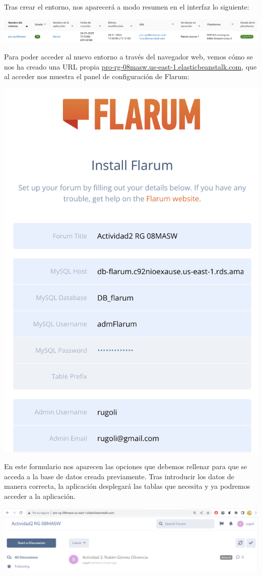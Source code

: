 \documentclass{\ClassPath/viu-tfm-template}
\begin{document}
Tras crear el entorno, nos aparecerá a modo resumen en el interfaz lo siguiente:
\begin{center}
    \includegraphics[frame,width=\linewidth]{img/beanstalk.png}
\end{center}

Para poder acceder al nuevo entorno a través del navegador web, vemos cómo se nos ha creado una URL propia \href{http://pro-rg-08masw.us-east-1.elasticbeanstalk.com/}{pro-rg-08masw.us-east-1.elasticbeanstalk.com}, que al acceder nos muestra el panel de configuración de Flarum:

\vspace{-10pt}
\begin{center}
    \includegraphics[frame,width=0.63\linewidth]{img/flarum-0.png}
\end{center}

En este formulario nos aparecen las opciones que debemos rellenar para que se acceda a la base de datos creada previamente. Tras introducir los datos de manera correcta, la aplicación desplegará las tablas que necesita y ya podremos acceder a la aplicación.

\begin{center}
    \includegraphics[frame,width=\linewidth]{img/flarum-1.png}
\end{center}
\end{document}
